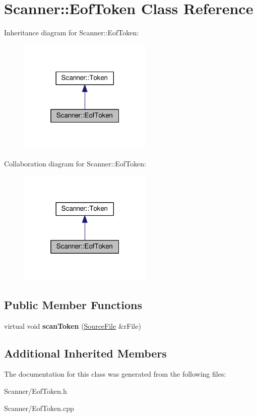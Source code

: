 \hypertarget{class_scanner_1_1_eof_token}{}\section{Scanner\+:\+:Eof\+Token Class Reference}
\label{class_scanner_1_1_eof_token}


Inheritance diagram for Scanner\+:\+:Eof\+Token\+:
\nopagebreak
\begin{figure}[H]
\begin{center}
\leavevmode
\includegraphics[width=181pt]{class_scanner_1_1_eof_token__inherit__graph}
\end{center}
\end{figure}


Collaboration diagram for Scanner\+:\+:Eof\+Token\+:
\nopagebreak
\begin{figure}[H]
\begin{center}
\leavevmode
\includegraphics[width=181pt]{class_scanner_1_1_eof_token__coll__graph}
\end{center}
\end{figure}
\subsection*{Public Member Functions}
\begin{DoxyCompactItemize}
\item 
virtual void {\bfseries scan\+Token} (\hyperlink{class_scanner_1_1_source_file}{Source\+File} \&r\+File)\hypertarget{class_scanner_1_1_eof_token_a983b7417f05df2468fba9652f969d6c4}{}\label{class_scanner_1_1_eof_token_a983b7417f05df2468fba9652f969d6c4}

\end{DoxyCompactItemize}
\subsection*{Additional Inherited Members}


The documentation for this class was generated from the following files\+:\begin{DoxyCompactItemize}
\item 
Scanner/Eof\+Token.\+h\item 
Scanner/Eof\+Token.\+cpp\end{DoxyCompactItemize}
